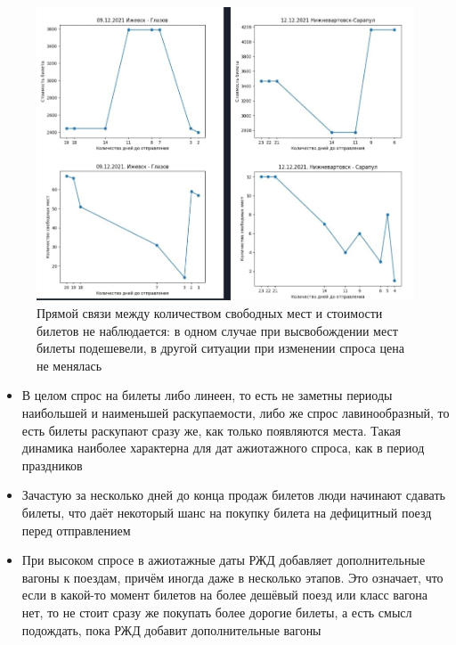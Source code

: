 \documentclass[conference]{IEEEtran}
\begin{document}
\begin{figure}
	\includegraphics[scale=0.4 ]{4pict}
	\caption{Прямой связи между количеством свободных мест и стоимости билетов не наблюдается: в одном случае при высвобождении мест билеты подешевели, в другой ситуации при изменении спроса цена не менялась}
\end{figure}

\begin{itemize}
	\item В целом спрос на билеты либо линеен, то есть не заметны периоды наибольшей и наименьшей раскупаемости, либо же спрос лавинообразный, то есть билеты раскупают сразу же, как только появляются места. Такая динамика наиболее характерна для дат ажиотажного спроса, как в период праздников
	
	\item Зачастую за несколько дней до конца продаж билетов люди начинают сдавать билеты, что даёт некоторый шанс на покупку билета на дефицитный поезд перед отправлением
	
	\item При высоком спросе в ажиотажные даты РЖД добавляет дополнительные вагоны к поездам, причём иногда даже в несколько этапов. Это означает, что если в какой-то момент билетов на более дешёвый поезд или класс вагона нет, то не стоит сразу же покупать более дорогие билеты, а есть смысл подождать, пока РЖД добавит дополнительные вагоны
\end{itemize}
\end{document}

